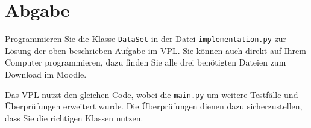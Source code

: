 \documentclass[]{article}
\begin{document}
\bigskip
\section{Abgabe}

Programmieren Sie die Klasse \verb|DataSet| in der Datei \verb|implementation.py| zur Lösung der oben beschrieben Aufgabe im VPL.
Sie können auch direkt auf Ihrem Computer programmieren, dazu finden Sie alle drei benötigten Dateien zum Download im Moodle.

\medskip
Das VPL nutzt den gleichen Code, wobei die \verb|main.py| um weitere Testfälle und Überprüfungen erweitert wurde.
Die Überprüfungen dienen dazu sicherzustellen, dass Sie die richtigen Klassen nutzen.
\end{document}
